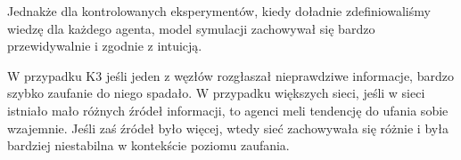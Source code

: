 \documentclass{article}
\begin{document}
	Jednakże dla kontrolowanych eksperymentów, kiedy doładnie zdefiniowaliśmy wiedzę dla każdego agenta, model symulacji zachowywał się bardzo przewidywalnie i zgodnie z intuicją. 
	
	W przypadku K3 jeśli jeden z węzłów rozgłaszał nieprawdziwe informacje, bardzo szybko zaufanie do niego spadało. W przypadku większych sieci, jeśli w sieci istniało mało różnych źródeł informacji, to agenci meli tendencję do ufania sobie wzajemnie. Jeśli zaś źródeł było więcej, wtedy sieć zachowywała się różnie i była bardziej niestabilna w kontekście poziomu zaufania.
\end{document}

